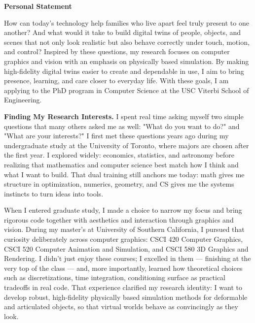\documentclass[11pt]{article}
\begin{document}
\vspace*{-18pt}
\begingroup
\centering
\Large\bfseries Personal Statement \par
\endgroup

How can today's technology help families who live apart feel truly present to
one another? And what would it take to build digital twins of people, objects,
and scenes that not only look realistic but also behave correctly under touch,
motion, and control? Inspired by these questions, my research focuses on
computer graphics and vision with an emphasis on physically based simulation. By
making high-fidelity digital twins easier to create and dependable in use, I aim
to bring presence, learning, and care closer to everyday life. With these goals,
I am applying to the PhD program in Computer Science at the USC Viterbi School
of Engineering.

\textbf{Finding My Research Interests.} 
I spent real time asking myself two simple questions that many others asked me
as well: "What do you want to do?" and "What are your interests?" I first
met these questions years ago during my undergraduate study at the University of Toronto, where majors are
chosen after the first year. I explored widely: economics, statistics, and
astronomy before realizing that mathematics and computer science best match how
I think and what I want to build. That dual training still anchors me today:
math gives me structure in optimization, numerics, geometry, and CS gives me the
systems instincts to turn ideas into tools.

When I entered graduate study, I made a choice to narrow my focus and
bring rigorous code together with aesthetics and interaction through graphics
and vision. During my master's at University of Southern
California, I pursued that curiosity deliberately across computer graphics: CSCI
420 Computer Graphics, CSCI 520 Computer Animation and Simulation, and CSCI 580
3D Graphics and Rendering. I didn't just enjoy these courses; I excelled in them
--- finishing at the very top of the class --- and, more importantly, learned
how theoretical choices such as discretizations, time integration, conditioning
surface as practical tradeoffs in real code. That experience clarified my
research identity: I want to develop robust, high-fidelity physically based
simulation methods for deformable and articulated objects, so that virtual
worlds behave as convincingly as they look.
\end{document}
